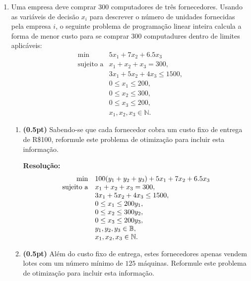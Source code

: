 \documentclass{article}
\newcommand{\N}{\mathbb{N}}
\begin{document}
\begin{enumerate}[resume*=exerc]
\item Uma empresa deve comprar 300 computadores de três fornecedores. Usando as variáveis de decisão $x_i$ para descrever o número de unidades fornecidas pela empresa $i$, o seguinte problema de programação linear inteira calcula a forma de menor custo para se comprar 300 computadures dentro de limites aplicáveis:
    \[
    \begin{array}{rl}
      \min & 5x_1 + 7x_2 + 6.5 x_3 \\
      \text{sujeito a} & x_1 + x_2 + x_3 = 300,\\
      & 3x_1 + 5x_2 + 4x_3 \leq 1500,\\
      &0 \leq x_1 \leq 200,\\
      &0 \leq x_2 \leq 300,\\
      &0 \leq x_3 \leq 200,\\
      &x_1,x_2,x_3 \in \N.
    \end{array}
    \]
\begin{enumerate}[label=(\alph*),series=q5]
\item {\bf (0.5pt)} Sabendo-se que cada fornecedor cobra um custo fixo de entrega de R\$100, reformule este problema de otimização para incluir esta informação.
\begin{framed}
{\bf Resolução:} %
    \[
    \begin{array}{rl}
      \min & 100(y_1+y_2+y_3)+5x_1 + 7x_2 + 6.5 x_3 \\
      \text{sujeito a} & x_1 + x_2 + x_3 = 300,\\
      & 3x_1 + 5x_2 + 4x_3 \leq 1500,\\
      &0 \leq x_1 \leq 200 y_1,\\
      &0 \leq x_2 \leq 300 y_2,\\
      &0 \leq x_3 \leq 200 y_3,\\
      &y_1,y_2,y_3 \in \mathbb{B},\\
      &x_1,x_2,x_3 \in \N.
    \end{array}
    \vspace{1cm}
    \]
\end{framed}
\item {\bf (0.5pt)} Além do custo fixo de entrega, estes fornecedores apenas vendem lotes com um número mínimo de $125$ máquinas. Reformule este problema de otimização para incluir esta informação.

\end{enumerate}
\end{enumerate}
\end{document}

